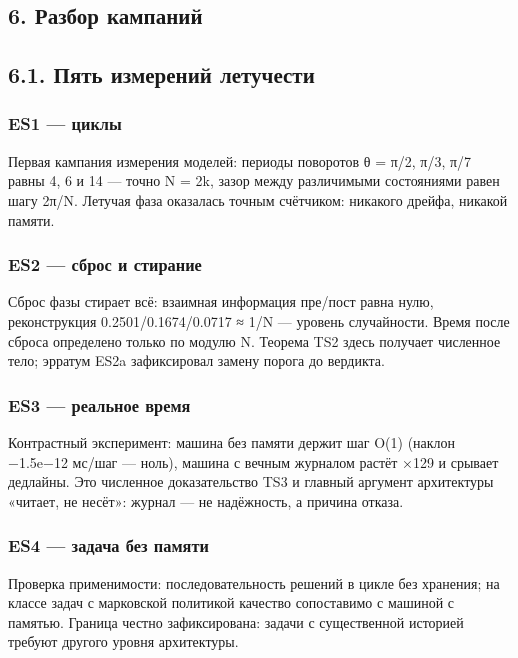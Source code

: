 \documentclass[11pt,a4paper]{article}
\begin{document}
\subsection{6. Разбор кампаний}

\subsection{6.1. Пять измерений летучести}

\subsubsection{ES1 — циклы}

Первая кампания измерения моделей: периоды поворотов θ = π/2, π/3, π/7 равны 4, 6 и 14 — точно N = 2k, зазор между различимыми состояниями равен шагу 2π/N. Летучая фаза оказалась точным счётчиком: никакого дрейфа, никакой памяти.

\subsubsection{ES2 — сброс и стирание}

Сброс фазы стирает всё: взаимная информация пре/пост равна нулю, реконструкция 0.2501/0.1674/0.0717 ≈ 1/N — уровень случайности. Время после сброса определено только по модулю N. Теорема TS2 здесь получает численное тело; эрратум ES2a зафиксировал замену порога до вердикта.

\subsubsection{ES3 — реальное время}

Контрастный эксперимент: машина без памяти держит шаг O(1) (наклон −1.5e−12 мс/шаг — ноль), машина с вечным журналом растёт ×129 и срывает дедлайны. Это численное доказательство TS3 и главный аргумент архитектуры «читает, не несёт»: журнал — не надёжность, а причина отказа.

\subsubsection{ES4 — задача без памяти}

Проверка применимости: последовательность решений в цикле без хранения; на классе задач с марковской политикой качество сопоставимо с машиной с памятью. Граница честно зафиксирована: задачи с существенной историей требуют другого уровня архитектуры.
\end{document}
